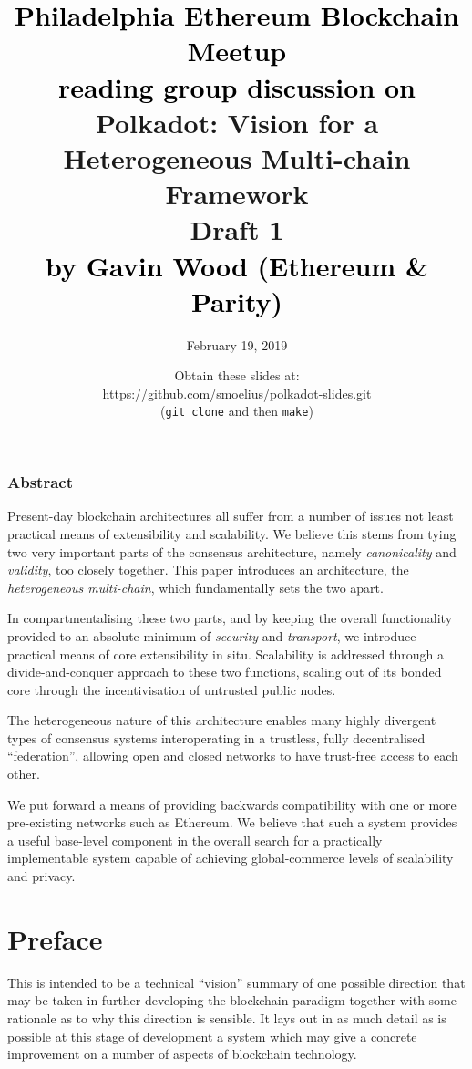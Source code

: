 \documentclass{beamer}
\title{\textcolor{black}{Philadelphia Ethereum Blockchain Meetup} \\
\textcolor{black}{reading group discussion on} \\
Polkadot: Vision for a Heterogeneous Multi-chain Framework \\ {\smaller \textbf{Draft 1}} \\
\textcolor{black}{by Gavin Wood (Ethereum \& Parity)}}
\author{February 19, 2019}
\date{Obtain these slides at: \\
\url{https://github.com/smoelius/polkadot-slides.git} \\
(\texttt{git clone} and then \texttt{make})}
\begin{document}
\maketitle

\begin{frame}
\frametitle{Abstract}

Present-day blockchain architectures all suffer from a number of issues not least practical means of extensibility and scalability. We believe this stems from tying two very important parts of the consensus architecture, namely \textit{canonicality} and \textit{validity}, too closely together. This paper introduces an architecture, the \textit{heterogeneous multi-chain}, which fundamentally sets the two apart.

In compartmentalising these two parts, and by keeping the overall functionality provided to an absolute minimum of \textit{security} and \textit{transport}, we introduce practical means of core extensibility in situ. Scalability is addressed through a divide-and-conquer approach to these two functions, scaling out of its bonded core through the incentivisation of untrusted public nodes.

 The heterogeneous nature of this architecture enables many highly divergent types of consensus systems interoperating in a trustless, fully decentralised ``federation'', allowing open and closed networks to have trust-free access to each other.

We put forward a means of providing backwards compatibility with one or more pre-existing networks such as Ethereum. We believe that such a system provides a useful base-level component in the overall search for a practically implementable system capable of achieving global-commerce levels of scalability and privacy.


\section{Preface}\label{preface}

 This is intended to be a technical ``vision'' summary of one possible direction that may be taken in further developing the blockchain paradigm together with some rationale as to why this direction is sensible. It lays out in as much detail as is possible at this stage of development a system which may give a concrete improvement on a number of aspects of blockchain technology.


\end{frame}
\end{document}
